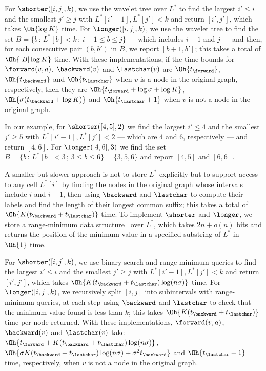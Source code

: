 For \(\shorter([i, j], k)\), we use the wavelet tree over $L^*$ to find the largest \(i' \leq i\) and the smallest \(j' \geq j\) with \(L^* [i' - 1], L^* [j'] < k\) and return \([i', j']\), which takes $\Oh{\log K}$ time.  For \(\longer([i, j], k)\), we use the wavelet tree to find the set \(B = \{b\,:\,L^* [b] < k\,;\,i - 1 \leq b \leq j\}\) --- which includes \(i - 1\) and $j$ --- and then, for each consecutive pair \((b, b')\) in $B$, we report \([b + 1, b']\); this takes a total of $\Oh{|B| \log K}$ time.  With these implementations, if the time bounds for \(\forward(v, a)\), \(\backward(v)\) and \(\lastchar(v)\) are $\Oh{t_\forward}$, $\Oh{t_\backward}$ and $\Oh{t_\lastchar}$ when $v$ is a node in the original graph, respectively, then they are $\Oh{t_\forward + \log \sigma + \log K}$, $\Oh{\sigma (t_\backward + \log K)}$ and $\Oh{t_\lastchar + 1}$ when $v$ is not a node in the original graph.

In our example, for \(\shorter([4, 5], 2)\) we find the largest \(i' \leq 4\) and the smallest \(j' \geq 5\) with \(L^* [i' - 1], L^* [j'] < 2\) --- which are 4 and 6, respectively --- and return \([4, 6]\).  For \(\longer([4, 6], 3)\) we find the set \(B = \{b\,:\,L^* [b] < 3\,;\,3 \leq b \leq 6\} = \{3, 5, 6\}\) and report \([4, 5]\) and \([6, 6]\).

A smaller but slower approach is not to store $L^*$ explicitly but to support access to any cell \(L^* [i]\) by finding the nodes in the original graph whose intervals include $i$ and \(i + 1\), then using $\backward$ and $\lastchar$ to compute their labels and find the length of their longest common suffix; this takes a total of $\Oh{K (t_\backward + t_\lastchar)}$ time.  To implement $\shorter$ and $\longer$, we store a range-minimum data structure~\cite{fh2011} over $L^*$, which takes \(2 n + o (n)\) bits and returns the position of the minimum value in a specified substring of $L^*$ in $\Oh{1}$ time.

For \(\shorter([i, j], k)\), we use binary search and range-minimum queries to find the largest \(i' \leq i\) and the smallest
\(j' \geq j\) with \(L^* [i' - 1], L^* [j'] < k\) and return \([i', j']\), which takes $\Oh{K (t_\backward + t_\lastchar) \log (n \sigma)}$ time. 
For \(\longer([i, j], k)\), we recursively split \([i, j]\) into subintervals with range-minimum queries, at each step using $\backward$ and $\lastchar$ to check that the minimum value found is less than $k$; this takes $\Oh{K (t_\backward + t_\lastchar)}$ time per node returned.  With these implementations, \(\forward(v, a)\), \(\backward(v)\) and \(\lastchar(v)\) take $\Oh{t_\forward + K (t_\backward + t_\lastchar) \log (n \sigma)}$, $\Oh{\sigma K (t_\backward + t_\lastchar) \log (n \sigma) + \sigma^2 t_\backward}$ and $\Oh{t_\lastchar + 1}$ time, respectively, when $v$ is not a node in the original graph.
\par

